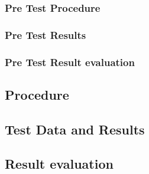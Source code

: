 \subsubsection{Pre Test Procedure}
\subsubsection{Pre Test Results}
\subsubsection{Pre Test Result evaluation}

\subsection{Procedure}
\subsection{Test Data and Results}
\subsection{Result evaluation}